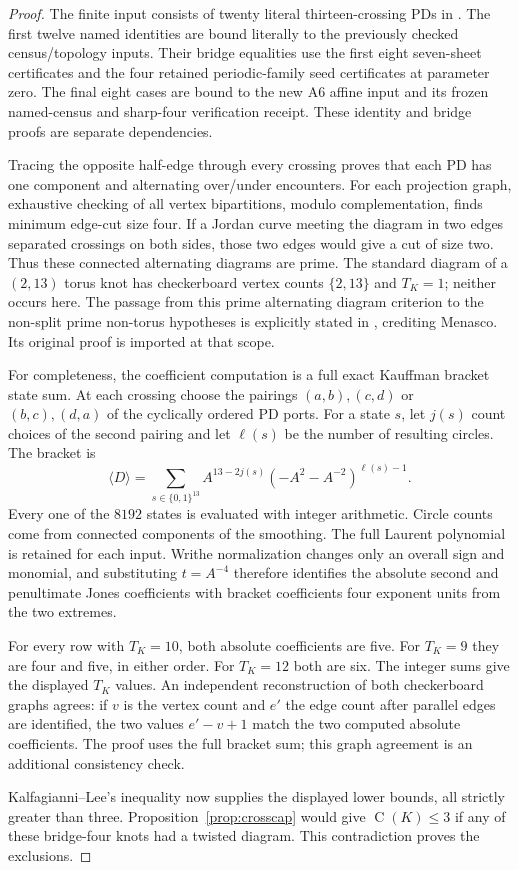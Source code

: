 \documentclass[11pt]{article}
\newcommand{\C}{\operatorname{C}}
\begin{document}
\begin{proof}
The finite input consists of twenty literal thirteen-crossing
PDs in .
The first twelve named identities are bound literally to the
previously checked census/topology inputs. Their bridge equalities
use the first eight seven-sheet certificates and the four retained
periodic-family seed certificates at parameter zero.
The final eight cases are bound to the new A6 affine input and its
frozen named-census and sharp-four verification receipt.
These identity and bridge proofs are separate dependencies.

Tracing the opposite half-edge through every crossing proves that
each PD has one component and alternating over/under encounters.
For each projection graph, exhaustive checking of all vertex
bipartitions, modulo complementation, finds minimum edge-cut size four.
If a Jordan curve meeting the diagram in two edges separated crossings
on both sides, those two edges would give a cut of size two.
Thus these connected alternating diagrams are prime.
The standard diagram of a $(2,13)$ torus knot has checkerboard vertex
counts $\{2,13\}$ and $T_K=1$; neither occurs here.
The passage from this prime alternating diagram criterion to the
non-split prime non-torus hypotheses is explicitly stated in
\cite[printed p.~2]{kl}, crediting Menasco. Its original proof is
imported at that scope.

For completeness, the coefficient computation is a full exact
Kauffman bracket state sum. At each crossing choose the pairings
$(a,b),(c,d)$ or $(b,c),(d,a)$ of the cyclically ordered PD ports.
For a state $s$, let $j(s)$ count choices of the second pairing and
let $\ell(s)$ be the number of resulting circles. The bracket is
\[
 \langle D\rangle=
 \sum_{s\in\{0,1\}^{13}}
 A^{13-2j(s)}(-A^2-A^{-2})^{\ell(s)-1}.
\]
Every one of the $8192$ states is evaluated with integer arithmetic.
Circle counts come from connected components of the smoothing.
The full Laurent polynomial is retained for each input.
Writhe normalization changes only an overall sign and monomial,
and substituting $t=A^{-4}$ therefore identifies the absolute
second and penultimate Jones coefficients with bracket coefficients
four exponent units from the two extremes.

For every row with $T_K=10$, both absolute coefficients are five.
For $T_K=9$ they are four and five, in either order.
For $T_K=12$ both are six.
The integer sums give the displayed $T_K$ values.
An independent reconstruction of both checkerboard graphs agrees:
if $v$ is the vertex count and $e'$ the edge count after parallel
edges are identified, the two values $e'-v+1$ match the two
computed absolute coefficients. The proof uses the full bracket
sum; this graph agreement is an additional consistency check.

Kalfagianni--Lee's inequality now supplies the displayed lower bounds,
all strictly greater than three. Proposition~\ref{prop:crosscap} would
give $\C(K)\le3$ if any of these bridge-four knots had a twisted diagram.
This contradiction proves the exclusions.
\end{proof}
\end{document}
